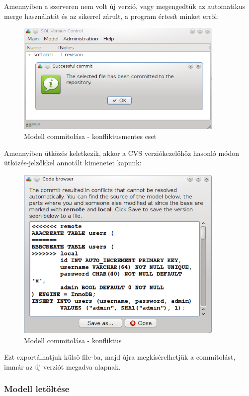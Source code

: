 \documentclass[a4paper,12pt]{article}
\begin{document}
Amennyiben a szerveren nem volt új verzió, vagy megengedtük az automatikus
merge használatát és az sikerrel zárult, a program értesít minket erről:

\begin{figure}[H]
\centering
\includegraphics[width=100mm,keepaspectratio]{model-commit-simple.png}
\caption{Modell commitolása - konfliktusmentes eset}
\end{figure}

Amennyiben ütközés keletkezik, akkor a CVS verziókezelőhöz hasonló módon
ütközés-jelzőkkel annotált kimenetet kapunk:

\begin{figure}[H]
\centering
\includegraphics[width=100mm,keepaspectratio]{model-commit-conflict.png}
\caption{Modell commitolása - konfliktus}
\end{figure}

Ezt exportálhatjuk külső file-ba, majd újra megkísérelhetjük a commitolást,
immár az új verziót megadva alapnak.

\subsubsection{Modell letöltése}
\end{document}
